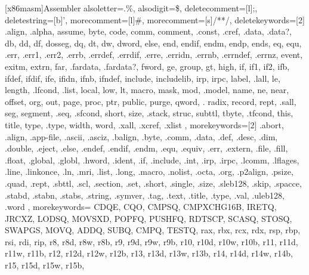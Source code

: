 [x86masm]{Assembler}{
  alsoletter={.\%},
  alsodigit={\$},
  deletecomment=[l];,
  deletestring=[b]',
  morecomment=[l]\#,
  morecomment=[s]{/*}{*/},
  deletekeywords=[2]{
    .align, .alpha, assume, byte, code, comm, comment, .const, 
    .cref, .data, .data?, db, dd, df, dosseg, dq, dt, dw, dword, else, end, endif, 
    endm, endp, ends, eq, equ, .err, .err1, .err2, .errb, .errdef, .errdif, 
    .erre, .erridn, .errnb, .errndef, .errnz, event, exitm, extrn, far, 
    .fardata, .fardata?, fword, ge, group, gt, high, if, if1, if2, ifb, ifdef, 
    ifdif, ife, ifidn, ifnb, ifndef, include, includelib, irp, irpc, label, 
    .lall, le, length, .lfcond, .list, local, low, lt, macro, mask, mod, .model, 
    name, ne, near, offset, org, out, page, proc, ptr, public, purge, qword, .
    radix, record, rept, .sall, seg, segment, .seq, .sfcond, short, size, 
    .stack, struc, subttl, tbyte, .tfcond, this, title, type, .type, width, 
    word, .xall, .xcref, .xlist
  },
  morekeywords=[2]{
    .abort, .align, .app-file, .ascii, .asciz, .balign, .byte, .comm,
    .data, .def, .desc, .dim, .double, .eject, .else, .endef, .endif, .endm,
    .equ, .equiv, .err, .extern, .file, .fill, .float, .global, .globl,
    .hword, .ident, .if, .include, .int, .irp, .irpc, .lcomm, .lflages,
    .line, .linkonce, .ln, .mri, .list, .long, .macro, .nolist, .octa, 
    .org, .p2align, .psize, .quad, .rept, .sbttl, .scl, .section, .set,
    .short, .single, .size, .sleb128, .skip, .spacce, .stabd, .stabn, .stabs,
    .string, .symver, .tag, .text, .title, .type, .val, .uleb128, .word
  },
  morekeywords={
    CDQE, CQO, CMPSQ, CMPXCHG16B, IRETQ, JRCXZ, LODSQ, MOVSXD, POPFQ, PUSHFQ, RDTSCP, SCASQ, STOSQ, SWAPGS,
    MOVQ, ADDQ, SUBQ, CMPQ, TESTQ,
    rax, rbx, rcx, rdx, rsp, rbp, rsi, rdi, rip,
     r8,  r8d,  r8w,  r8b, 
     r9,  r9d,  r9w,  r9b, 
    r10, r10d, r10w, r10b, 
    r11, r11d, r11w, r11b, 
    r12, r12d, r12w, r12b, 
    r13, r13d, r13w, r13b, 
    r14, r14d, r14w, r14b, 
    r15, r15d, r15w, r15b, 
  }
}
